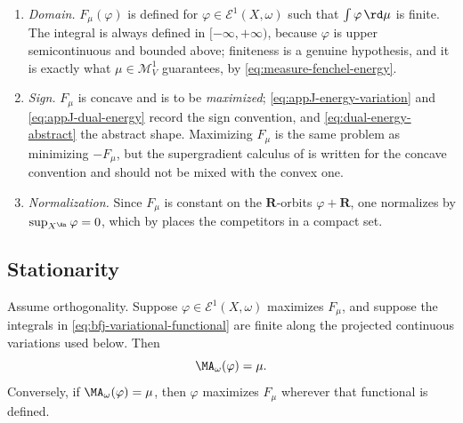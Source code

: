 \begin{enumerate}
\item \emph{Domain.}  \(F_\mu(\varphi)\) is defined for
\(\varphi\in\mathcal E^1(X,\omega)\) such that \(\int\varphi\,\rd\mu\) is
finite.  The integral is always defined in \([-\infty,+\infty)\), because
\(\varphi\) is upper semicontinuous and bounded above; finiteness is a
genuine hypothesis, and it is exactly what \(\mu\in\mathcal M^1_V\)
guarantees, by \eqref{eq:measure-fenchel-energy}.
\item \emph{Sign.}  \(F_\mu\) is concave and is to be \emph{maximized};
\eqref{eq:appJ-energy-variation} and \eqref{eq:appJ-dual-energy} record the
sign convention, and \eqref{eq:dual-energy-abstract} the abstract shape.
Maximizing \(F_\mu\) is the same problem as minimizing \(-F_\mu\), but
the supergradient calculus of
 is written for the concave convention and
should not be mixed with the convex one.
\item \emph{Normalization.}  Since \(F_\mu\) is constant on the
\(\mathbf R\)-orbits \(\varphi+\mathbf R\), one normalizes by
\(\sup_{X^{\An}}\varphi=0\), which by
 places the competitors in a compact set.
\end{enumerate}

\subsection{Stationarity}
\label{sec:ch27-stationarity}

\begin{proposition}\label{prop:bfj-euler-lagrange}
Assume orthogonality. Suppose
\(\varphi\in\mathcal E^1(X,\omega)\) maximizes \(F_\mu\), and suppose the
integrals in \eqref{eq:bfj-variational-functional} are finite along the projected
continuous variations used below. Then
\begin{equation}\label{eq:euler-lagrange-equation}
                           \MA_\omega(\varphi)=\mu.
\end{equation}
Conversely, if \(\MA_\omega(\varphi)=\mu\), then \(\varphi\) maximizes
\(F_\mu\) wherever that functional is defined.
\end{proposition}

